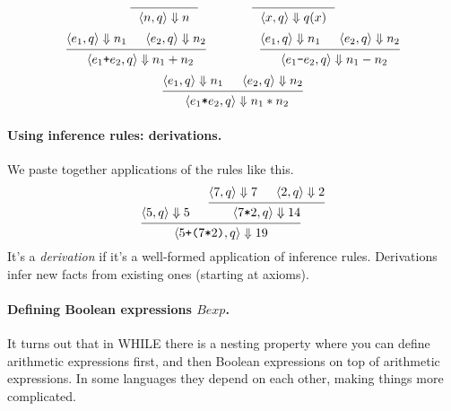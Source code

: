\documentclass[11pt]{article}
\begin{document}
\[
  \begin{prooftree}
  \infer0{~~\langle n, q \rangle \Downarrow n~~}
  \end{prooftree} \hspace*{4em} \
  \begin{prooftree}
  \infer0{~~\langle x, q \rangle \Downarrow q(x)~~}
  \end{prooftree}
\]
\[
  \begin{prooftree}
    \hypo{\langle e_1, q \rangle \Downarrow n_1}
    \hypo{\langle e_2, q \rangle \Downarrow n_2}
  \infer2{~~\langle e_1 \texttt{+} e_2, q \rangle \Downarrow n_1 + n_2}
  \end{prooftree}  \hspace*{4em} \
  \begin{prooftree}
    \hypo{\langle e_1, q \rangle \Downarrow n_1}
    \hypo{\langle e_2, q \rangle \Downarrow n_2}
  \infer2{~~\langle e_1 \texttt{-} e_2, q \rangle \Downarrow n_1 - n_2}
  \end{prooftree}
\]
\[
  \begin{prooftree}
    \hypo{\langle e_1, q \rangle \Downarrow n_1}
    \hypo{\langle e_2, q \rangle \Downarrow n_2}
  \infer2{~~\langle e_1 \texttt{*} e_2, q \rangle \Downarrow n_1 * n_2}
  \end{prooftree}
\]

\paragraph{Using inference rules: derivations.} We paste together applications of the rules like this.
\[
\begin{prooftree}
 \hypo{\langle 5, q \rangle \Downarrow 5}
  \hypo{\langle 7, q \rangle \Downarrow 7}
  \hypo{\langle 2, q \rangle \Downarrow 2}
  \infer2{\langle 7 \texttt{*} 2, q \rangle \Downarrow 14}
 \infer2{\langle 5 \texttt{+} \texttt{(}7\texttt{*}2\texttt{)}, q \rangle \Downarrow 19}
\end{prooftree}
\]
It's a \emph{derivation} if it's a well-formed application of inference rules. Derivations infer
new facts from existing ones (starting at axioms).

\paragraph{Defining Boolean expressions $\mathit{Bexp}$.} It turns out that in WHILE there is a nesting property where you can define arithmetic expressions first, and then Boolean expressions on top of arithmetic expressions. In some languages they depend on each other, making things more complicated.
\end{document}
